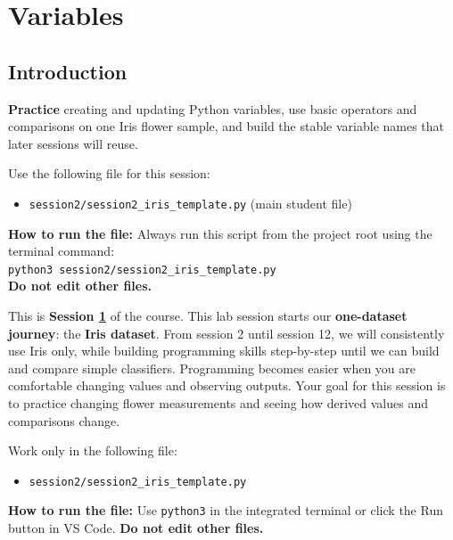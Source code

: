 \chapter{Variables}
\label{ch:variables}
\section{Introduction}

\begin{tcolorbox}[title=Goal]
\textbf{Practice} creating and updating Python variables, use basic operators and comparisons on one Iris flower sample, and build the stable variable names that later sessions will reuse.
\end{tcolorbox}

\begin{tcolorbox}[title=You will work in]
Use the following file for this session:
\begin{itemize}
    \item \texttt{session2/session2\_iris\_template.py} (main student file)
\end{itemize}
\textbf{How to run the file:} Always run this script from the project root using the terminal command: \\
\texttt{python3 session2/session2\_iris\_template.py} \\
\textbf{Do not edit other files.}
\end{tcolorbox}

\noindent
This is \textbf{Session \ref{ch:variables}} of the course.
This lab session starts our \textbf{one-dataset journey}: the \textbf{Iris dataset}.
From session 2 until session 12, we will consistently use Iris only, while building programming skills step-by-step until we can build and compare simple classifiers. Programming becomes easier when you are comfortable changing values and observing outputs. Your goal for this session is to practice changing flower measurements and seeing how derived values and comparisons change.

\begin{tcolorbox}[title=Hands-on file for this session]
Work only in the following file:
\begin{itemize}
    \item \texttt{session2/session2\_iris\_template.py}
\end{itemize}
\textbf{How to run the file:} Use \texttt{python3} in the integrated terminal or click the Run button in VS Code. \textbf{Do not edit other files.}
\end{tcolorbox}

